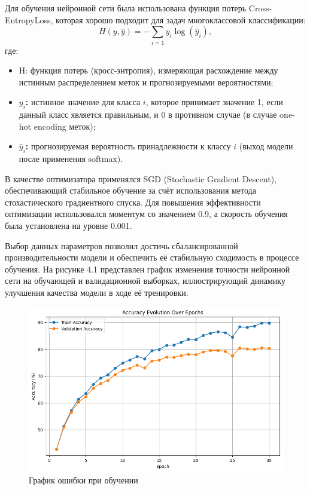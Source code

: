 {Для обучения нейронной сети была использована функция потерь Cross-EntropyLoss, которая хорошо подходит для задач многоклассовой классификации:
\[
H(y, \hat{y}) = -\sum_{i=1} y_{i} \log(\hat{y}_{i}),
\] 
где:
\begin{itemize}
    \item H: функция потерь (кросс-энтропия), измеряющая расхождение между истинным распределением меток и прогнозируемыми вероятностями;
    \item \textbf{\(y_i\):} истинное значение для класса \(i\), которое принимает значение 1, если данный класс является правильным, и 0 в противном случае (в случае one-hot encoding меток);
    \item \textbf{\(\hat{y}_i\):} прогнозируемая вероятность принадлежности к классу \(i\) (выход модели после применения softmax).
\end{itemize}

В качестве оптимизатора применялся SGD (Stochastic Gradient Descent), обеспечивающий стабильное обучение за счёт использования метода стохастического градиентного спуска. Для повышения эффективности оптимизации использовался моментум со значением 0.9, а скорость обучения была установлена на уровне 0.001.

Выбор данных параметров позволил достичь сбалансированной производительности модели и обеспечить её стабильную сходимость в процессе обучения. На рисунке 4.1 представлен график изменения точности нейронной сети на обучающей и валидационной выборках, иллюстрирующий динамику улучшения качества модели в ходе её тренировки.
\begin{figure}[H]
    \centering
    \includegraphics[width=1\textwidth]{assets/accuracy_evolution.png} 
    \caption{График ошибки при обучении}
\end{figure}

}
